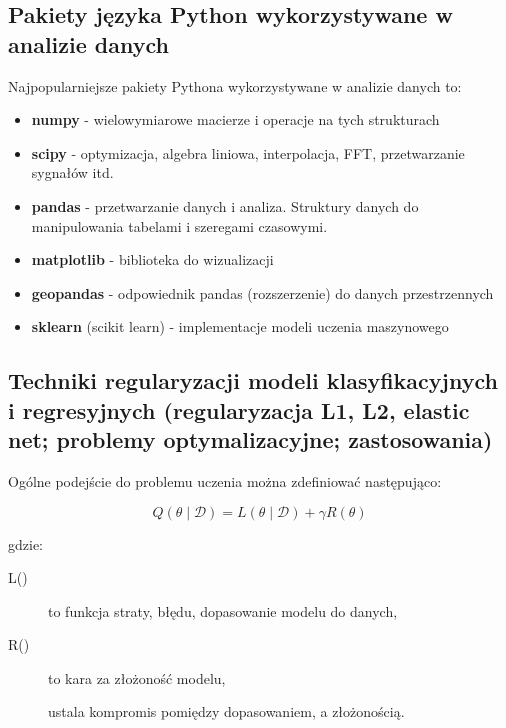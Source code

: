 \documentclass[wi]{zut}
\begin{document}
\subsection{Pakiety języka Python wykorzystywane w analizie danych}

Najpopularniejsze pakiety Pythona wykorzystywane w analizie danych to:

\begin{itemize}
    \item \textbf{numpy} - wielowymiarowe macierze i operacje na tych strukturach
    \item \textbf{scipy} - optymizacja, algebra liniowa, interpolacja, FFT, przetwarzanie sygnałów itd.
    \item \textbf{pandas} - przetwarzanie danych i analiza. Struktury danych do manipulowania tabelami i szeregami czasowymi.
    \item \textbf{matplotlib} - biblioteka do wizualizacji
    \item \textbf{geopandas} - odpowiednik pandas (rozszerzenie) do danych przestrzennych
    \item \textbf{sklearn} (scikit learn) - implementacje modeli uczenia maszynowego
\end{itemize}

\subsection{Techniki regularyzacji modeli klasyfikacyjnych i regresyjnych (regularyzacja L1, L2, elastic net; problemy optymalizacyjne; zastosowania)}

Ogólne podejście do problemu uczenia można zdefiniować następująco:

\begin{equation}
    Q(\theta \mid \mathscr{D})=L(\theta \mid \mathscr{D})+\gamma R(\theta)
\end{equation}

gdzie:

\begin{description}
\item[L(\theta \mid {})] to funkcja straty, błędu, dopasowanie modelu do danych,
\item[R(\theta)] to kara za złożoność modelu,
\item[\gamma] ustala kompromis pomiędzy dopasowaniem, a złożonością.
\end{description}
\end{document}
